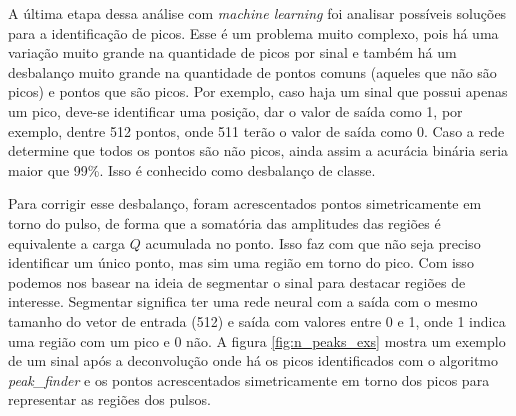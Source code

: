 \documentclass[a4paper,12pt,oneside]{book}
\begin{document}
\par A última etapa dessa análise com \textit{machine learning} foi analisar possíveis soluções para a identificação de picos. Esse é um problema muito complexo, pois há uma variação muito grande na quantidade de picos por sinal e também há um desbalanço muito grande na quantidade de pontos comuns (aqueles que não são picos) e pontos que são picos. Por exemplo, caso haja um sinal que possui apenas um pico, deve-se identificar uma posição, dar o valor de saída como 1, por exemplo, dentre 512 pontos, onde 511 terão o valor de saída como 0. Caso a rede determine que todos os pontos são não picos, ainda assim a acurácia binária seria maior que 99\%. Isso é conhecido como desbalanço de classe\cite{inproceedings}.

\par Para corrigir esse desbalanço, foram acrescentados pontos simetricamente em torno do pulso, de forma que a somatória das amplitudes das regiões é equivalente a carga $Q$ acumulada no ponto. Isso faz com que não seja preciso identificar um único ponto, mas sim uma região em torno do pico. Com isso podemos nos basear na ideia de segmentar o sinal para destacar regiões de interesse\cite{aly2011research}. Segmentar significa ter uma rede neural com a saída com o mesmo tamanho do vetor de entrada (512) e saída com valores entre 0 e 1, onde 1 indica uma região com um pico e 0 não. A figura \ref{fig:n_peaks_exs} mostra um exemplo de um sinal após a deconvolução onde há os picos identificados com o algoritmo \textit{peak\_finder} e os pontos acrescentados simetricamente em torno dos picos para representar as regiões dos pulsos.

\end{document}

